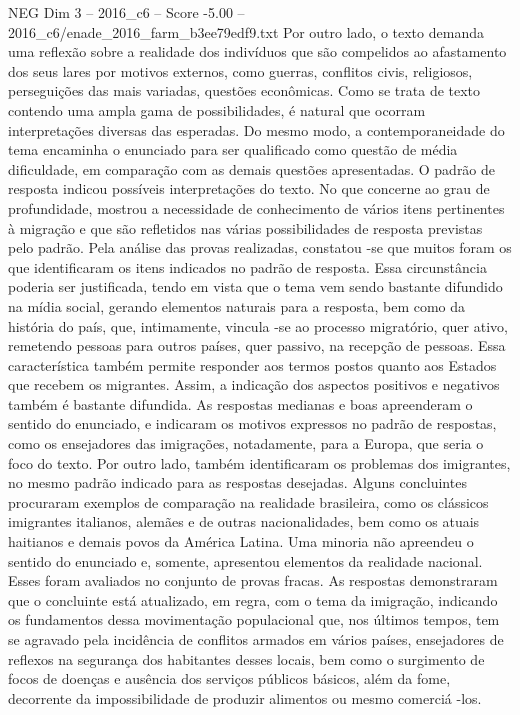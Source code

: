 \begin{textsample}{NEG Dim 3 – 2016\_c6 – Score -5.00 – 2016\_c6/enade\_2016\_farm\_b3ee79edf9.txt}
Por outro lado, o texto demanda uma reflexão sobre a realidade dos indivíduos que são compelidos ao afastamento dos seus lares por motivos externos, como guerras, conflitos civis, religiosos, perseguições das mais variadas, questões econômicas.
Como se trata de texto contendo uma ampla gama de possibilidades, é natural que ocorram interpretações diversas das esperadas.
Do mesmo modo, a contemporaneidade do tema encaminha o enunciado para ser qualificado como questão de média dificuldade, em comparação com as demais questões apresentadas.
O padrão de resposta indicou possíveis interpretações do texto.
No que concerne ao grau de profundidade, mostrou a necessidade de conhecimento de vários itens pertinentes à migração e que são refletidos nas várias possibilidades de resposta previstas pelo padrão.
Pela análise das provas realizadas, constatou -se que muitos foram os que identificaram os itens indicados no padrão de resposta.
Essa circunstância poderia ser justificada, tendo em vista que o tema vem sendo bastante difundido na mídia social, gerando elementos naturais para a resposta, bem como da história do país, que, intimamente, vincula -se ao processo migratório, quer ativo, remetendo pessoas para outros países, quer passivo, na recepção de pessoas.
Essa característica também permite responder aos termos postos quanto aos Estados que recebem os migrantes.
Assim, a indicação dos aspectos positivos e negativos também é bastante difundida.
As respostas medianas e boas apreenderam o sentido do enunciado, e indicaram os motivos expressos no padrão de respostas, como os ensejadores das imigrações, notadamente, para a Europa, que seria o foco do texto.
Por outro lado, também identificaram os problemas dos imigrantes, no mesmo padrão indicado para as respostas desejadas.
Alguns concluintes procuraram exemplos de comparação na realidade brasileira, como os clássicos imigrantes italianos, alemães e de outras nacionalidades, bem como os atuais haitianos e demais povos da América Latina.
Uma minoria não apreendeu o sentido do enunciado e, somente, apresentou elementos da realidade nacional.
Esses foram avaliados no conjunto de provas fracas.
As respostas demonstraram que o concluinte está atualizado, em regra, com o tema da imigração, indicando os fundamentos dessa movimentação populacional que, nos últimos tempos, tem se agravado pela incidência de conflitos armados em vários países, ensejadores de reflexos na segurança dos habitantes desses locais, bem como o surgimento de focos de doenças e ausência dos serviços públicos básicos, além da fome, decorrente da impossibilidade de produzir alimentos ou mesmo comerciá -los.

\end{textsample}
